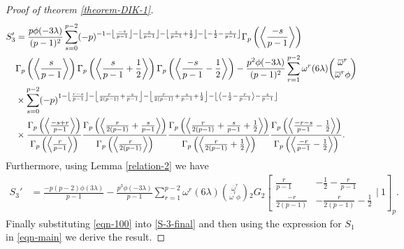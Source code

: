 \documentclass[12pt]{amsart}
\theoremstyle{plain}
\theoremstyle{definition}
\theoremstyle{remark}
\numberwithin{equation}{section}
\begin{document}
\begin{proof}[Proof of theorem \ref{theorem-DIK-1}]
  \begin{align}
 S_3'&=\frac{p\phi(-3\lambda)}{(p-1)^2}\sum_{s=0}^{p-2}(-p)^{-1-\left\lfloor\frac{-s}{p-1}\right\rfloor-\left\lfloor\frac{s}{p-1}\right\rfloor-\left\lfloor\frac{s}{p-1}+\frac{1}{2}\right\rfloor-\left\lfloor-\frac{1}{2}-\frac{s}{p-1}\right\rfloor}\Gamma_p\left(\left\langle\frac{-s}{p-1}\right\rangle\right)\\&\Gamma_p\left(\left\langle\frac{s}{p-1}\right\rangle\right)\Gamma_p\left(\left\langle\frac{s}{p-1}+\frac{1}{2}\right\rangle\right)\Gamma_p\left(\left\langle\frac{-s}{p-1}-\frac{1}{2}\right\rangle\right) -
 \frac{p^2\phi(-3\lambda)}{(p-1)^2} \sum_{r=1}^{p-2}{\omega}^r(6\lambda) \binom{\overline{\omega}^r}{\overline{\omega}^r\phi}\notag\\&\times \sum_{s=0}^{p-2}(-p)^{1-\left\lfloor\frac{r-s}{p-1}\right\rfloor-\left\lfloor\frac{r}{2(p-1)}+\frac{s}{p-1}\right\rfloor-\left\lfloor\frac{r}{2(p-1)}+\frac{s}{p-1}+\frac{1}{2}\right\rfloor-\left\lfloor\left\langle-\frac{1}{2}-\frac{r}{p-1}\right\rangle-\frac{s}{p-1}\right\rfloor}\notag\\
 &\times
  \frac{\Gamma_p\left(\left\langle\frac{-s+r}{p-1}\right\rangle\right)}{\Gamma_p\left(\left\langle\frac{r}{p-1}\right\rangle\right)}
 \frac{ \Gamma_p\left(\left\langle\frac{r}{2(p-1)}+\frac{s}{p-1}\right\rangle\right)}{\Gamma_p\left(\left\langle\frac{r}{2(p-1)}\right\rangle\right)}
   \frac{\Gamma_p\left(\left\langle\frac{r}{2(p-1)}+\frac{s}{p-1}+\frac{1}{2}\right\rangle\right)}{\Gamma_p\left(\left\langle\frac{r}{2(p-1)}+\frac{1}{2}\right\rangle\right)}
 \frac{\Gamma_p\left(\left\langle\frac{-r-s}{p-1}-\frac{1}{2}\right\rangle\right)}{\Gamma_p\left(\left\langle\frac{-r}{p-1} -\frac{1}{2}\right\rangle\right)}.\notag
\end{align} 
	Furthermore, using Lemma \ref{relation-2} we have
	\begin{align}\label{eqn-100}
	 S_3'&=\frac{-p(p-2)\phi(3\lambda)}{p-1}-\frac{p^3\phi(-3\lambda)}{p-1}\sum\limits_{r=1}^{p-2}\omega^r(6\lambda)
	 \binom{\overline{\omega}^r}{\overline{\omega}^r\phi}{}_2G_2\left[\begin{array}{cc}
  \frac{r}{p-1}   & -\frac{1}{2} -\frac{r}{p-1}  \\
  \frac{-r}{2(p-1)}    & -\frac{r}{2(p-1)} -\frac{1}{2} \end{array}|\ 1 \right]_p.
	\end{align}
    	Finally substituting \eqref{eqn-100} into \eqref{S-3-final} and then using the expression for $S_1$ in \eqref{eqn-main}
we derive the result.	
\end{proof}
\end{document}
